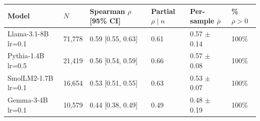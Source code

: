 \begin{tabular}{llllll}
\toprule
 Model                        & $N$      & Spearman $\rho$ [95\% CI]   & Partial $\rho \mid n$   & Per-sample $\bar\rho$    & \% $\rho{>}0$   \\
\midrule
 Llama-3.1-8B {\small lr=0.1} & 71{,}778 & 0.59 {\small [0.55, 0.63]}  & 0.61                    & 0.57 {\small $\pm$ 0.14} & 100\%           \\
 Pythia-1.4B {\small lr=0.5}  & 21{,}419 & 0.56 {\small [0.54, 0.59]}  & 0.66                    & 0.57 {\small $\pm$ 0.08} & 100\%           \\
 SmolLM2-1.7B {\small lr=0.1} & 16{,}654 & 0.53 {\small [0.51, 0.55]}  & 0.63                    & 0.53 {\small $\pm$ 0.07} & 100\%           \\
 Gemma-3-4B {\small lr=0.1}   & 10{,}579 & 0.44 {\small [0.38, 0.49]}  & 0.49                    & 0.48 {\small $\pm$ 0.19} & 100\%           \\
\bottomrule
\end{tabular}
